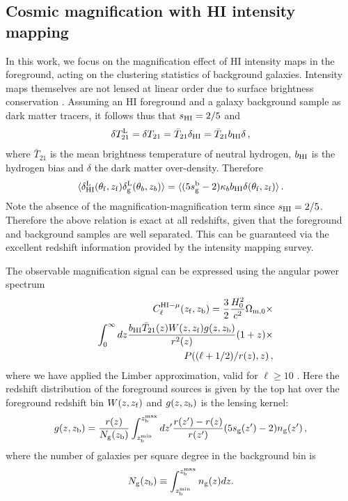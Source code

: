 \documentclass[useAMS,usenatbib]{mnras}
\newcommand{\be}{\begin{equation}}
\newcommand{\ee}{\end{equation}}
\newcommand{\bea}{\begin{eqnarray}}
\newcommand{\eea}{\end{eqnarray}}
\begin{document}

\subsection{Cosmic magnification with HI intensity mapping}

In this work, we focus on the magnification effect of HI intensity maps in the foreground, acting on the clustering statistics of background galaxies. Intensity maps themselves are not lensed at linear order due to surface brightness conservation \citep{PhysRevD.87.064026}. Assuming an HI foreground and a galaxy background sample as dark matter tracers, it follows thus that $s_{\rm HI} = 2/5$ and
\be
\delta T^{\rm L}_{21}=\delta T_{21}=\bar{T}_{21} \delta_{\rm HI} = \bar{T}_{21} b_{\rm HI} \delta \, ,
\ee where $\bar{T}_{21}$ is the mean brightness temperature of neutral hydrogen, $b_{\rm HI}$ is the hydrogen bias and $\delta$ the dark matter over-density. Therefore
\be
\langle \delta^{\rm L}_{\rm HI}(\theta_{\rm f},z_{\rm f}) \delta^{\rm L}_{\rm g}(\theta_b,z_b) \rangle
= \langle (5s^{\rm b}_{\rm g}-2) \kappa_b  b_{\rm HI} \delta (\theta_{\rm f},z_{\rm f}) \rangle \, .
\ee
Note the absence of the magnification-magnification term since $s_{\rm HI}=2/5$. Therefore the above relation is exact at all redshifts, given that the foreground and background samples are well separated. This can be guaranteed via the excellent redshift information provided by the intensity mapping survey.



The observable magnification signal can be expressed using the angular power spectrum \citet{2008PhRvD..78l3517Z}
\bea
\label{eq:clhimu}
&&C^{{\rm HI} - \mu}_\ell (z_{\rm f}, z_{\rm b}) = \frac{3}{2}\frac{H^2_0}{c^2}\Omega_{{\rm m},0} \times  \nonumber \\
&& \int^{\infty}_0 dz \frac{b_{\rm HI}\bar{T}_{21}(z)W(z,z_{\rm f})g(z,z_{\rm b})}{r^2(z)}(1+z) \times \nonumber \\ 
&& P((\ell+1/2)/r(z),z) \, ,
\eea
where we have applied the Limber approximation, valid for $\ell \geq 10$ \citep{1954ApJ...119..655L,2008PhRvD..78l3506L}. Here the redshift distribution of the foreground sources is given by the top hat over the foreground redshift bin $W(z,z_{\rm f})$ and $g(z,z_{\rm b})$ is the lensing kernel:
\be
g(z,z_{\rm b})=\frac{r(z)}{N_{\rm g}(z_{\rm b})}\int^{z_{\rm b}^{\rm max}}_{z_{\rm b}^{\rm min}} dz' \frac{r(z')-r(z)}{r(z')}(5s_{\rm g}(z')-2)n_{\rm g}(z') \, ,
\label{eq:gkernel}
\ee
where the number of galaxies per square degree in the background bin is
\be
N_{\rm g}(z_{\rm b}) \equiv \int_{z_{\rm b}^{\rm min}}^{z_{\rm b}^{\rm max}} n_{\rm g}(z)dz.
\label{eq:ngNg}
\ee
\end{document}
